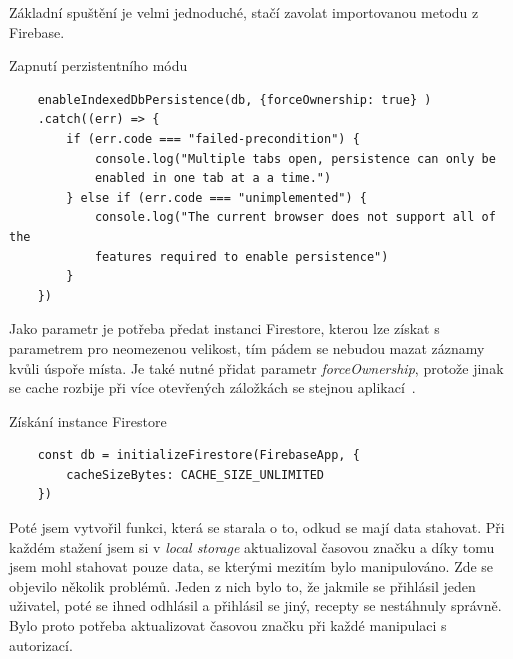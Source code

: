 Základní spuštění je velmi jednoduché, stačí zavolat importovanou metodu z Firebase.

\begin{listing}[h]
    \caption{Zapnutí perzistentního módu}
    \begin{verbatim}
    enableIndexedDbPersistence(db, {forceOwnership: true} )
    .catch((err) => {
        if (err.code === "failed-precondition") {
            console.log("Multiple tabs open, persistence can only be
            enabled in one tab at a a time.")
        } else if (err.code === "unimplemented") {
            console.log("The current browser does not support all of the
            features required to enable persistence")
        }
    })
    \end{verbatim}
\end{listing}

Jako parametr je potřeba předat instanci Firestore, kterou lze získat s parametrem pro neomezenou velikost, tím pádem se nebudou
mazat záznamy kvůli úspoře místa. Je také nutné přidat parametr \emph{forceOwnership}, protože jinak se cache rozbije při více
otevřených záložkách se stejnou aplikací~\cite{FirebaseMultipleTabs}.

\begin{listing}[h]
    \caption{Získání instance Firestore}
    \begin{verbatim}
    const db = initializeFirestore(FirebaseApp, {
        cacheSizeBytes: CACHE_SIZE_UNLIMITED
    })
    \end{verbatim}
\end{listing}

Poté jsem vytvořil funkci, která se starala o to, odkud se mají data stahovat. Při každém stažení jsem si v \emph{local storage} aktualizoval
časovou značku a díky tomu jsem mohl stahovat pouze data, se kterými mezitím bylo manipulováno. Zde se objevilo několik problémů. Jeden z nich
bylo to, že jakmile se přihlásil jeden uživatel, poté se ihned odhlásil a přihlásil se jiný, recepty se nestáhnuly správně. Bylo proto potřeba
aktualizovat časovou značku při každé manipulaci s autorizací.

